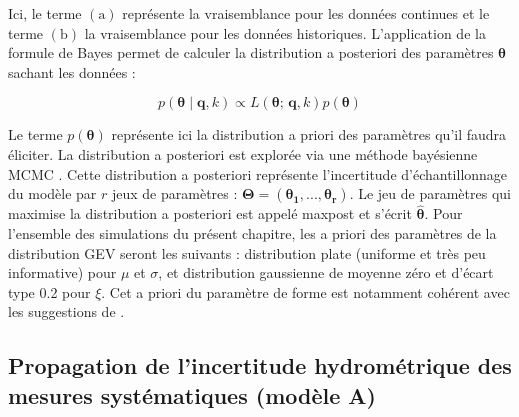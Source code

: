 			Ici, le terme \textit{$\mathrm{(a)}$} représente la vraisemblance pour les données continues et le terme \textit{$\mathrm{(b)}$} la vraisemblance pour les données historiques. L'application de la formule de Bayes permet de calculer la distribution a posteriori des paramètres $\boldsymbol{\theta}$ sachant les données :
			
			\begin{equation}
				p(\boldsymbol{\theta} \mid \boldsymbol{q},k) \propto L(\boldsymbol{\theta};\,\boldsymbol{q},k) p(\boldsymbol{\theta})
				\label{eq:BayesBinom}
			\end{equation}
	
		Le terme $p(\boldsymbol{\theta})$ représente ici la distribution a priori des paramètres qu'il faudra éliciter. La distribution a posteriori est explorée via une méthode bayésienne MCMC \citep{renard_application_2006}. Cette distribution a posteriori représente l'incertitude d'échantillonnage du modèle par $r$ jeux de paramètres : $\boldsymbol{\Theta} = (\boldsymbol{\theta_1},...,\boldsymbol{\theta_r})$. Le jeu de paramètres qui maximise la distribution a posteriori est appelé maxpost et s'écrit $\boldsymbol{ \hat{\theta} }$. Pour l'ensemble des simulations du présent chapitre, les a priori des paramètres de la distribution GEV seront les suivants : distribution plate (uniforme et très peu informative) pour $\mu$ et $\sigma$, et distribution gaussienne de moyenne zéro et d'écart type 0.2 pour $\xi$. Cet a priori du paramètre de forme est notamment cohérent avec les suggestions de \citet{martins_generalized_2000}.
	
	

	
	\subsection{Propagation de l'incertitude hydrométrique des mesures systématiques (modèle A)}
	\label{subsec:modA}
	
